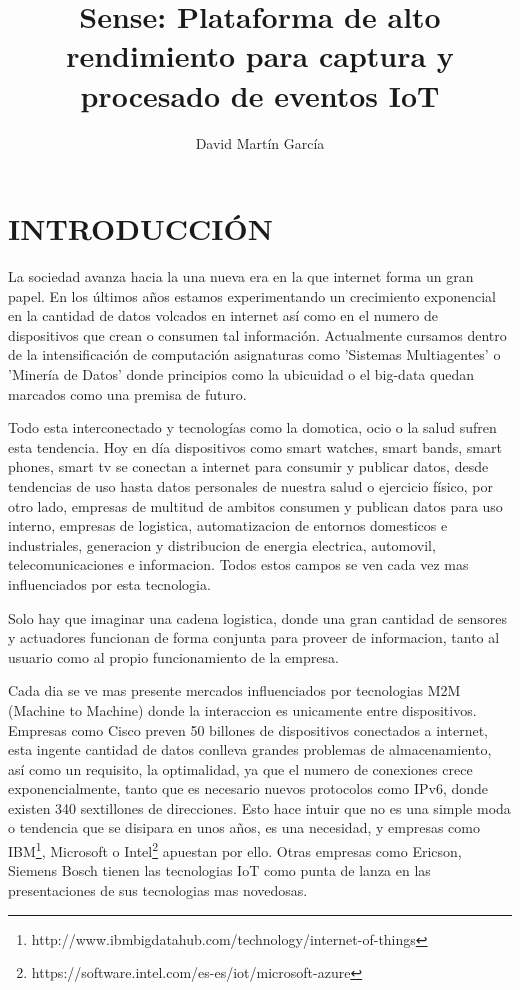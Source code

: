 \documentclass{pre-tfg}
\title{Sense: Plataforma de alto rendimiento para captura y procesado de eventos IoT}
\author{David Martín García}
\begin{document}
\maketitle
\tableofcontents

\newpage

\section{INTRODUCCIÓN}

La sociedad avanza hacia la una nueva era en la que internet forma un
gran papel. En los últimos años estamos experimentando un crecimiento exponencial en la cantidad de datos volcados en internet así como en el numero de dispositivos que crean o consumen tal información. Actualmente cursamos dentro de la intensificación de computación asignaturas como 'Sistemas Multiagentes' o 'Minería de Datos' donde principios como la ubicuidad o el big-data quedan marcados como una premisa de futuro.

Todo esta interconectado y tecnologías como la domotica, ocio o la
salud sufren esta tendencia. Hoy en día dispositivos como smart
watches, smart bands, smart phones, smart tv se conectan a internet
para consumir y publicar datos, desde tendencias de uso hasta datos
personales de nuestra salud o ejercicio físico, por otro lado,
empresas de multitud de ambitos consumen y publican datos para uso
interno, empresas de logistica, automatizacion de entornos domesticos
e industriales, generacion y distribucion de energia electrica,
automovil, telecomunicaciones e informacion. Todos estos campos se ven
cada vez mas influenciados por esta tecnologia.

Solo hay que imaginar una cadena logistica, donde una gran cantidad de
sensores y actuadores funcionan de forma conjunta para proveer de
informacion, tanto al usuario como al propio funcionamiento de la
empresa.

Cada dia se ve mas presente mercados influenciados por tecnologias M2M
(Machine to Machine) donde la interaccion es unicamente entre
dispositivos. Empresas como Cisco preven 50 billones de dispositivos conectados a
internet, esta ingente cantidad de datos conlleva grandes problemas de almacenamiento, así como un
requisito, la optimalidad, ya que el numero de conexiones crece
exponencialmente, tanto que es necesario nuevos protocolos como IPv6,
donde existen 340 sextillones de direcciones. Esto hace intuir que no
es una simple moda o tendencia que se disipara en unos años, es una
necesidad, y empresas como
IBM\footnote{http://www.ibmbigdatahub.com/technology/internet-of-things},
Microsoft o
Intel\footnote{https://software.intel.com/es-es/iot/microsoft-azure}
apuestan por ello. Otras empresas como Ericson, Siemens Bosch tienen las tecnologias IoT
como punta de lanza en las presentaciones de sus tecnologias mas
novedosas.
\end{document}
